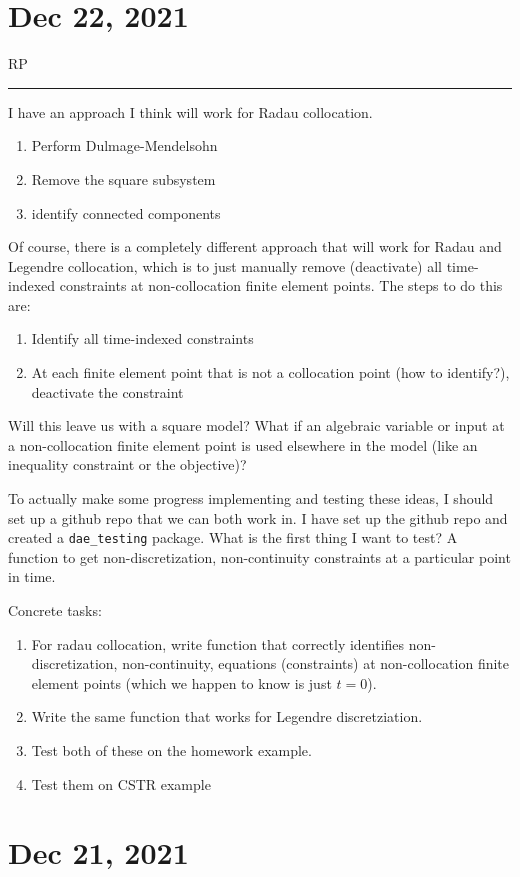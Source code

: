 \documentclass{article}
\newcommand{\RP}{RP\vspace{0.1cm}\hrule\vspace{0.2cm}}
\begin{document}
\section{Dec 22, 2021}
\RP
I have an approach I think will work for Radau collocation.
\begin{enumerate}
  \item Perform Dulmage-Mendelsohn
  \item Remove the square subsystem
  \item identify connected components
\end{enumerate}
Of course, there is a completely different approach that will work
for Radau and Legendre collocation, which is to just manually remove
(deactivate) all time-indexed constraints at non-collocation finite
element points.
The steps to do this are:
\begin{enumerate}
  \item Identify all time-indexed constraints
  \item At each finite element point that is not a collocation point
    (how to identify?), deactivate the constraint
\end{enumerate}
Will this leave us with a square model? What if an algebraic variable or
input at a non-collocation finite element point is used elsewhere in the
model (like an inequality constraint or the objective)?

\medskip

To actually make some progress implementing and testing these ideas, I should
set up a github repo that we can both work in.
I have set up the github repo and created a \texttt{dae\_testing} package.
What is the first thing I want to test? A function to get non-discretization,
non-continuity constraints at a particular point in time.

\medskip
Concrete tasks:
\begin{enumerate}
  \item For radau collocation, write function that correctly identifies
    non-discretization, non-continuity, equations (constraints) at
    non-collocation finite element points (which we happen to know is just
    $t=0$).
  \item Write the same function that works for Legendre discretziation.
  \item Test both of these on the homework example.
  \item Test them on CSTR example
\end{enumerate}

\section{Dec 21, 2021}
\end{document}
